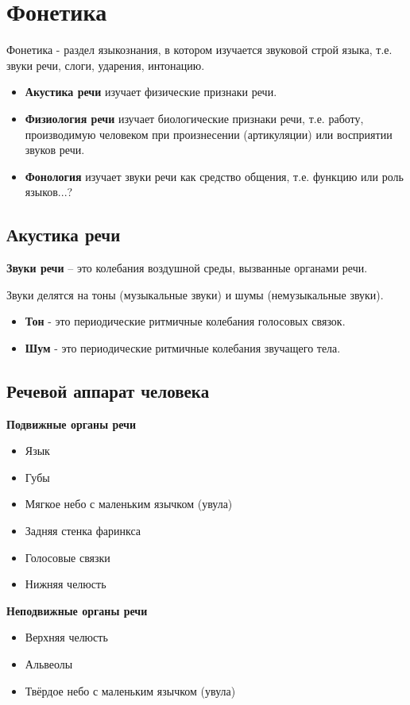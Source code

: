 \documentclass{article}
\begin{document}
\section{Фонетика}
Фонетика - раздел языкознания, в котором изучается звуковой
строй языка, т.е. звуки речи, слоги, ударения, интонацию.

\begin{itemize}
    \item \textbf{Акустика речи} изучает физические признаки речи.
    \item \textbf{Физиология речи} изучает биологические признаки речи, 
    т.е. работу, производимую человеком при произнесении (артикуляции) 
    или восприятии звуков речи.
    \item \textbf{Фонология} изучает звуки речи как средство общения, 
    т.е. функцию или роль языков...?
\end{itemize}

\subsection{Акустика речи}
\textbf{Звуки речи} -- это колебания воздушной среды, вызванные органами речи.

Звуки делятся на тоны (музыкальные звуки) и шумы (немузыкальные звуки).
\begin{itemize}
    \item \textbf{Тон} - это периодические ритмичные колебания голосовых связок.
    \item \textbf{Шум} - это периодические ритмичные колебания звучащего тела.
\end{itemize}

\subsection{Речевой аппарат человека}
\textbf{Подвижные органы речи}
\begin{itemize}
    \item Язык
    \item Губы
    \item Мягкое небо с маленьким язычком (увула)
    \item Задняя стенка фаринкса
    \item Голосовые связки
    \item Нижняя челюсть
\end{itemize}

\textbf{Неподвижные органы речи}
\begin{itemize}
    \item Верхняя челюсть
    \item Альвеолы
    \item Твёрдое небо с маленьким язычком (увула)
\end{itemize}
\end{document}
